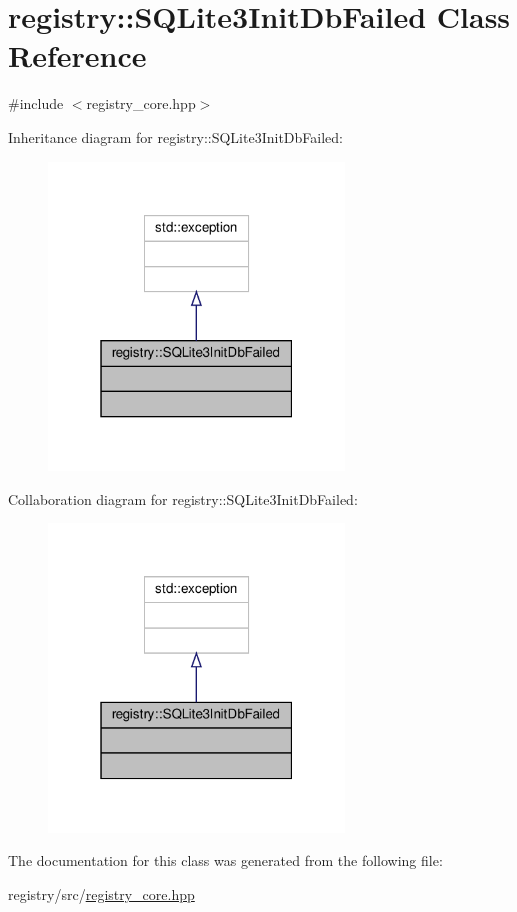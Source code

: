 \hypertarget{classregistry_1_1SQLite3InitDbFailed}{}\section{registry\+:\+:S\+Q\+Lite3\+Init\+Db\+Failed Class Reference}
\label{classregistry_1_1SQLite3InitDbFailed}


{\ttfamily \#include $<$registry\+\_\+core.\+hpp$>$}



Inheritance diagram for registry\+:\+:S\+Q\+Lite3\+Init\+Db\+Failed\+:
\nopagebreak
\begin{figure}[H]
\begin{center}
\leavevmode
\includegraphics[width=223pt]{classregistry_1_1SQLite3InitDbFailed__inherit__graph}
\end{center}
\end{figure}


Collaboration diagram for registry\+:\+:S\+Q\+Lite3\+Init\+Db\+Failed\+:
\nopagebreak
\begin{figure}[H]
\begin{center}
\leavevmode
\includegraphics[width=223pt]{classregistry_1_1SQLite3InitDbFailed__coll__graph}
\end{center}
\end{figure}


The documentation for this class was generated from the following file\+:\begin{DoxyCompactItemize}
\item 
registry/src/\hyperlink{registry__core_8hpp}{registry\+\_\+core.\+hpp}\end{DoxyCompactItemize}
